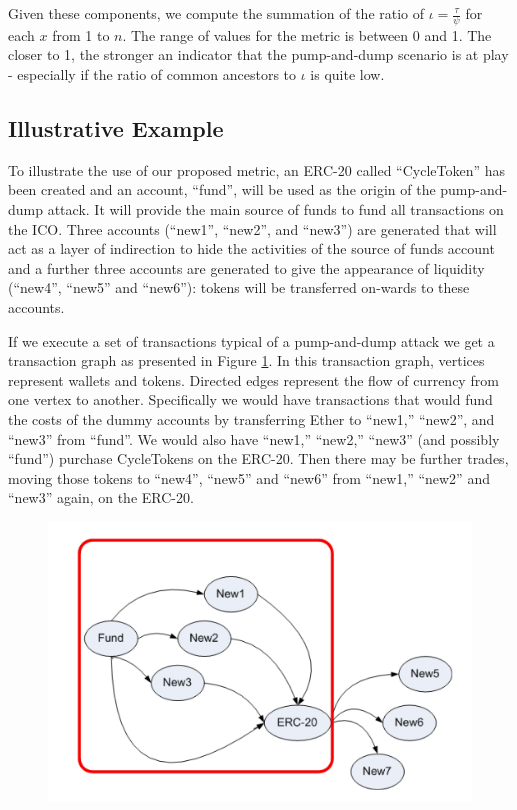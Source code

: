 \documentclass[conference]{IEEEtran}
\begin{document}
Given these components, we compute the summation of the ratio of $\iota = \frac{\tau}{\psi}$ for each $x$ from 1 to $n$.  The range of values for the metric is between 0 and 1.   The closer to 1, the stronger an indicator that the pump-and-dump scenario is at play - especially if the ratio of common ancestors to $\iota$ is quite low.

\subsection{Illustrative Example}

To illustrate the use of our proposed metric, an ERC-20 called ``CycleToken'' has been created and an account, ``fund'', will be used as the origin of the pump-and-dump attack. It will provide the main source of funds to fund all transactions on the ICO. Three accounts (``new1'', ``new2'', and ``new3'') are generated that will act as a layer of indirection to hide the activities of the source of funds account and a further three accounts are generated to give the appearance of liquidity (``new4'', ``new5'' and ``new6''): tokens will be transferred on-wards to these accounts.

If we execute a set of transactions typical of a pump-and-dump attack we get a transaction graph as presented in Figure \ref{fig:illustrativeExample}. In this transaction graph, vertices represent wallets and tokens. Directed edges represent the flow of currency from one vertex to another. Specifically we would have transactions that would fund the costs of the dummy accounts by transferring Ether to ``new1,'' ``new2'', and ``new3'' from ``fund''. We would also have ``new1,'' ``new2,'' ``new3'' (and possibly ``fund'') purchase CycleTokens on the ERC-20. Then there may be further trades, moving those tokens to ``new4'', ``new5'' and ``new6'' from ``new1,'' ``new2'' and ``new3'' again, on the ERC-20.

\begin{figure}[htbp]
    \centering
    \includegraphics[width=0.6\columnwidth]{images/illustrativeExample.png}
    \caption{}
    \label{fig:illustrativeExample}
\end{figure}
\end{document}
